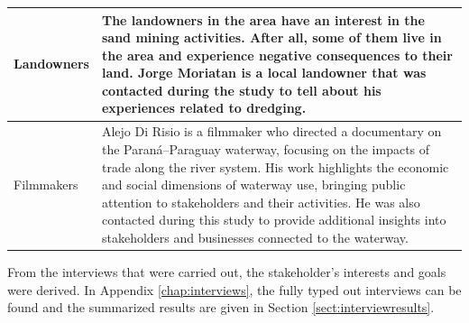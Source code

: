 \begin{table}[H]
\begin{tabularx}{\linewidth}{p{3.5cm}X}
\midrule
Landowners & The landowners in the area have an interest in the sand mining activities. After all, some of them live in the area and experience negative consequences to their land. Jorge Moriatan is a local landowner that was contacted during the study to tell about his experiences related to dredging. \\
\midrule
Filmmakers & Alejo Di Risio is a filmmaker who directed a documentary on the Paraná–Paraguay waterway, focusing on the impacts of trade along the river system. His work highlights the economic and social dimensions of waterway use, bringing public attention to stakeholders and their activities. He was also contacted during this study to provide additional insights into stakeholders and businesses connected to the waterway. \\
\bottomrule
\end{tabularx}
\label{tab:stakeholders-description}
\end{table}

From the interviews that were carried out, the stakeholder's interests and goals were derived. In Appendix \ref{chap:interviews}, the fully typed out interviews can be found and the summarized results are given in Section \ref{sect:interviewresults}.

